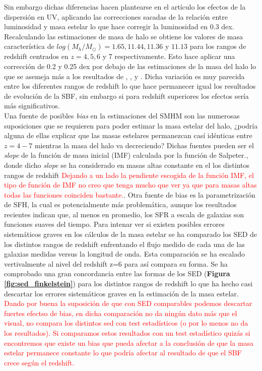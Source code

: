 \documentclass{article}
\begin{document}
Sin embargo dichas diferencias hacen plantearse en el artículo los efectos de la dispersión en UV, aplicando las correcciones sacadas de la relación entre luminosidad y masa estelar lo que hace corregir la luminosidad en 0.3 dex. Recalculando las estimaciones de masa de halo se obtiene los valores de masa característica de $log(M_h/M_\odot)=1.65, 11.44, 11.36$ y $11.13$ para los rangos de redshift centrados en $z=4,5,6$ y 7 respectivamente. Esto hace aplicar una corrección de 0.2 y 0.25 dex por debajo de las estimaciones de la masa del halo lo que se asemeja más a los resultados de \cite{behroozi2013average}, \cite{barone2014measurement}, \cite{lee2006large} y \cite{overzier2006clustering}. Dicha variación es muy parecida entre los diferentes rangos de redshift lo que hace permanecer igual los resultados de evolución de la SBF, sin embargo si para redshift superiores los efectos sería más significativos.\\

Una fuente de posibles \textit{bias} en la estimaciones del SMHM son las numerosas suposiciones que se requieren para poder estimar la masa estelar del halo, ¿podría alguna de ellas explicar que las masas estelares permanezcan casí idénticas entre $z=4-7$ mientras la masa del halo va decreciendo? Dichas fuentes pueden ser el \textit{slope} de la función de masa inicial (IMF) calculada por la función de Salpeter., donde dicho \textit{slope} se ha considerado en masas altas constante en el los distintos rangos de redshift \textcolor{red}{Dejando a un lado la pendiente escogida de la función IMF, el tipo de función de IMF no creo que tenga mucho que ver ya que para masas altas todas las funciones coinciden bastante.}. Otra fuente de bias es la parametrización de SFH, la cual es potencialmente más problemática, aunque los resultados recientes indican que, al menos en promedio, los SFR a escala de galaxias son funciones suaves del tiempo. Para intenar ver si existen posibles errores sistemáticos graves en los cálculos de la masa estelar se ha comparado  los SED de los distintos rangos de redshift enfrentando el flujo medido de cada una de las galaxias medidas versus la longitud de onda. Esta comparación se ha escalado vertivalmente al nivel del redshift z=6 para así compara su forma. Se ha comprobado una gran concordancia entre las formas de los SED (\textbf{Figura \ref{fig:sed_finkelstein}}) para los distintos rangos de redshift lo que ha hecho casi descartar los errores sistemáticos graves en la estimación de la masa estelar. \textcolor{red}{Dando por buena la suposición de que con SED comparables podemos descartar fuertes efectso de bias, en dicha comparación no da ningún dato más que el visual, no compara los distintos sed con test estadísticos (o por lo menos no da los resultados). Si comparamos estos resultados con un test estadístico quizás si encontremos que existe un bias que pueda afectar a la conclusión de que la masa estelar permanece constante lo que podría afectar al resultado de que el SBF crece según el redshift.}\\
\end{document}
